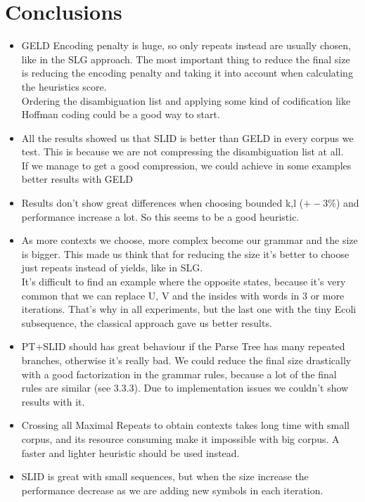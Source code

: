 	\chapter{Conclusions}

	\begin{itemize}
		\item GELD Encoding penalty is huge, so only repeats instead are usually chosen, like in the
		SLG approach. The most important thing to reduce the final size is reducing the encoding penalty and taking it into account when calculating the heuristics score. \\
		Ordering the disambiguation list and applying some kind of codification like Hoffman coding could 
		be a good way to start. \\

		\item All the results showed us that SLID is better than GELD in every corpus we test. 
		This is because we are not compressing the disambiguation list at all. \\
		If we manage to get a good compression, we could achieve in some examples better
		results with GELD

		\item Results don't show great differences when choosing bounded k,l ($+-3\%$) and performance
		increase a lot. So this seems to be a good heuristic.

		\item As more contexts we choose, more complex become our grammar and the size
		is bigger. This made us think that for reducing the size it's better to choose just repeats instead
		of yields, like in SLG.\\
		It's difficult to find an example where the opposite states, because it's very common
		that we can replace U, V and the insides with words in 3 or more iterations. That's
		why in all experiments, but the last one with the tiny Ecoli subsequence, the
		classical approach gave us better results. \\


		\item PT+SLID should has great behaviour if the Parse Tree has many repeated branches, 
		otherwise it's really bad. We could reduce the final size drastically with
		a good factorization in the grammar rules, because a lot of the final rules are similar (see 3.3.3).
		Due to implementation issues we couldn't show results with it.

		\item Crossing all Maximal Repeats to obtain contexts takes long time with small corpus, 
		and its resource consuming make it impossible with big corpus. 
		A faster and lighter heuristic should be used instead.

		\item SLID is great with small sequences, but when the size increase the performance
		decrease as we are adding new symbols in each iteration. 
	\end{itemize}

